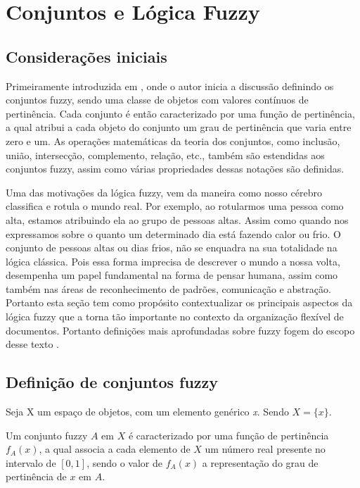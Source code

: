 \section{Conjuntos e Lógica Fuzzy}
\subsection{Considerações iniciais}
Primeiramente introduzida em \cite{Zadeh1965}, onde o autor inicia a discussão definindo os
conjuntos fuzzy, sendo uma classe de objetos com valores contínuos de pertinência. Cada conjunto é então caracterizado por uma função de pertinência, a qual atribui a cada objeto do conjunto um grau de 
pertinência que varia entre zero e um. As operações matemáticas da teoria dos conjuntos, como
inclusão, união, intersecção, complemento, relação, etc., também são estendidas aos conjuntos fuzzy,
assim como várias propriedades dessas notações são definidas.

Uma das motivações da lógica fuzzy, vem da maneira como nosso cérebro classifica e rotula o mundo
real. Por exemplo, ao rotularmos uma pessoa como alta, estamos atribuindo ela ao grupo de pessoas 
altas. Assim como quando nos expressamos sobre o quanto um determinado dia está fazendo calor ou 
frio. O conjunto de pessoas altas ou dias frios, não se enquadra na sua totalidade na lógica 
clássica. Pois essa forma imprecisa de descrever o mundo a nossa volta, desempenha
um papel fundamental na forma de pensar humana, assim como também nas áreas de reconhecimento 
de padrões, comunicação e abstração\cite{Zadeh1965}.
Portanto esta seção tem como propósito contextualizar os principais aspectos da lógica
fuzzy que a torna tão importante no contexto da organização flexível de documentos. Portanto definições mais aprofundadas sobre fuzzy fogem do escopo desse texto .

\subsection{Definição de conjuntos fuzzy}

Seja X um espaço de objetos, com um elemento genérico {\it x\/}. 
Sendo $X= \big\{x\big\}$.

Um conjunto fuzzy $A$ em $X$ é caracterizado por uma função de pertinência $f_A(x)$, a qual associa
a cada elemento de $X$ um número real presente no intervalo de $[0,1]$, sendo o valor de $f_A(x)$
a representação do grau de pertinência de $x$ em $A$.

